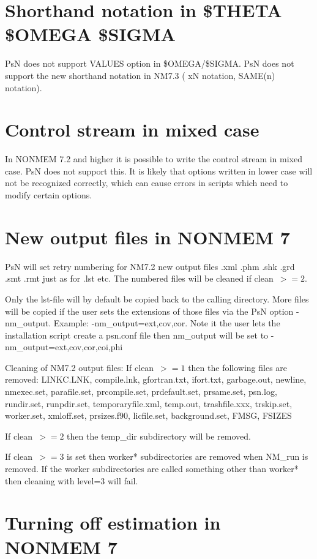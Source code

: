 \section{Shorthand notation in \$THETA \$OMEGA \$SIGMA}
PsN does not support VALUES option in \$OMEGA/\$SIGMA. 
PsN does not support the new shorthand notation in NM7.3 ( xN notation, SAME(n) notation).

\section{Control stream in mixed case}
In NONMEM 7.2 and higher it is possible to write the control stream in mixed case. PsN does not support this. It is likely that options written in lower case will not be recognized correctly, which can cause errors in scripts which
need to modify certain options.

\section{New output files in NONMEM 7}
PsN will set retry numbering for NM7.2 new output 
files .xml .phm .shk .grd .smt .rmt just as for .lst etc. 
The numbered files will be cleaned if \mbox{clean $>=2$}.

Only the lst-file will by default be copied back to the calling directory. 
More files will be copied if the user sets the extensions of those files via the PsN option -nm\_output. Example: -nm\_output=ext,cov,cor. Note it the user lets the installation script create a psn.conf file then nm\_output will be set to -nm\_output=ext,cov,cor,coi,phi 

Cleaning of NM7.2 output files: If \mbox{clean $>=1$} then the following files are removed: LINKC.LNK, compile.lnk, gfortran.txt, ifort.txt, garbage.out, newline, nmexec.set, parafile.set, prcompile.set, prdefault.set, prsame.set, psn.log, rundir.set, runpdir.set, temporaryfile.xml, temp.out, trashfile.xxx, trskip.set, worker.set, xmloff.set, prsizes.f90, licfile.set, background.set, FMSG, FSIZES

If \mbox{clean $>=2$} then the temp\_dir subdirectory will be removed.

If \mbox{clean $>=3$} is set then worker* subdirectories are removed when NM\_run is removed. If the worker subdirectories are called something other than worker* then cleaning with level=3 will fail.  

\section{Turning off estimation in NONMEM 7}

